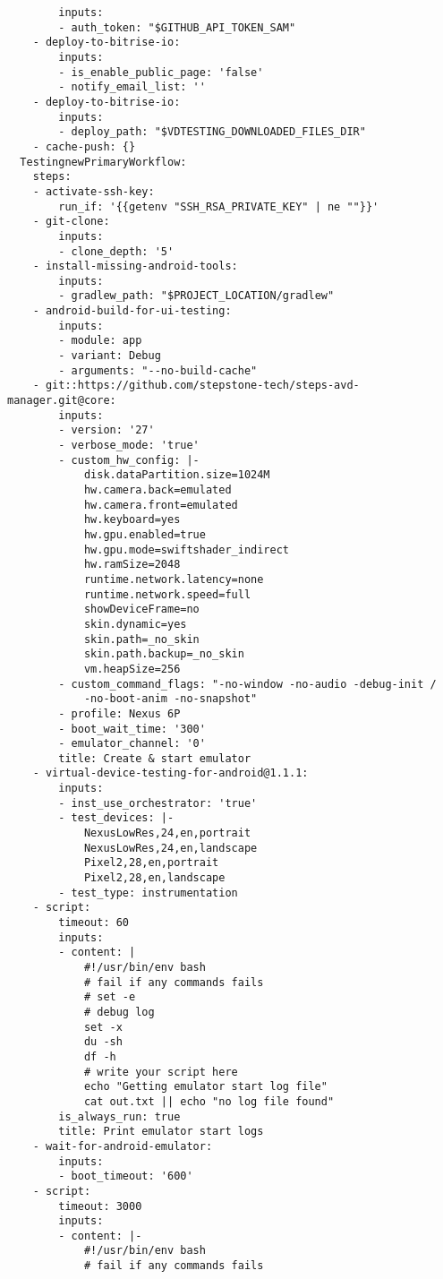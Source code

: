 \begin{verbatim}
        inputs:
        - auth_token: "$GITHUB_API_TOKEN_SAM"
    - deploy-to-bitrise-io:
        inputs:
        - is_enable_public_page: 'false'
        - notify_email_list: ''
    - deploy-to-bitrise-io:
        inputs:
        - deploy_path: "$VDTESTING_DOWNLOADED_FILES_DIR"
    - cache-push: {}
  TestingnewPrimaryWorkflow:
    steps:
    - activate-ssh-key:
        run_if: '{{getenv "SSH_RSA_PRIVATE_KEY" | ne ""}}'
    - git-clone:
        inputs:
        - clone_depth: '5'
    - install-missing-android-tools:
        inputs:
        - gradlew_path: "$PROJECT_LOCATION/gradlew"
    - android-build-for-ui-testing:
        inputs:
        - module: app
        - variant: Debug
        - arguments: "--no-build-cache"
    - git::https://github.com/stepstone-tech/steps-avd-manager.git@core:
        inputs:
        - version: '27'
        - verbose_mode: 'true'
        - custom_hw_config: |-
            disk.dataPartition.size=1024M
            hw.camera.back=emulated
            hw.camera.front=emulated
            hw.keyboard=yes
            hw.gpu.enabled=true
            hw.gpu.mode=swiftshader_indirect
            hw.ramSize=2048
            runtime.network.latency=none
            runtime.network.speed=full
            showDeviceFrame=no
            skin.dynamic=yes
            skin.path=_no_skin
            skin.path.backup=_no_skin
            vm.heapSize=256
        - custom_command_flags: "-no-window -no-audio -debug-init /
            -no-boot-anim -no-snapshot"
        - profile: Nexus 6P
        - boot_wait_time: '300'
        - emulator_channel: '0'
        title: Create & start emulator
    - virtual-device-testing-for-android@1.1.1:
        inputs:
        - inst_use_orchestrator: 'true'
        - test_devices: |-
            NexusLowRes,24,en,portrait
            NexusLowRes,24,en,landscape
            Pixel2,28,en,portrait
            Pixel2,28,en,landscape
        - test_type: instrumentation
    - script:
        timeout: 60
        inputs:
        - content: |
            #!/usr/bin/env bash
            # fail if any commands fails
            # set -e
            # debug log
            set -x
            du -sh
            df -h
            # write your script here
            echo "Getting emulator start log file"
            cat out.txt || echo "no log file found"
        is_always_run: true
        title: Print emulator start logs
    - wait-for-android-emulator:
        inputs:
        - boot_timeout: '600'
    - script:
        timeout: 3000
        inputs:
        - content: |-
            #!/usr/bin/env bash
            # fail if any commands fails

\end{verbatim}
